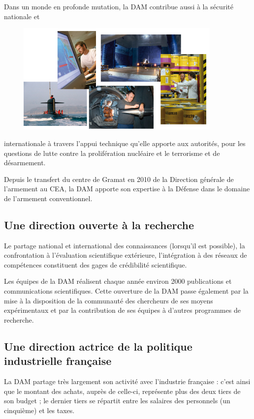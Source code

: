 \documentclass[12pt,a4paper,twoside]{article}
\begin{document}
    Dans un monde en profonde mutation, la DAM contribue aussi à la sécurité
    nationale et
    \begin{figure}
        \includegraphics[width=10cm]{ressources/images/dam/5_thumbnails.jpg}
    \end{figure}
    internationale à travers l'appui technique qu'elle apporte aux autorités, pour
    les questions de lutte contre la prolifération nucléaire et le terrorisme et de
    désarmement.

    Depuis le transfert du centre de Gramat en 2010 de la Direction générale de
    l'armement au CEA, la DAM apporte son expertise à la Défense dans le domaine de
    l'armement conventionnel.

    \subsection*{Une direction ouverte à la recherche}
    Le partage national et international des connaissances (lorsqu'il est possible),
    la confrontation à l'évaluation scientifique extérieure, l'intégration à des
    réseaux de compétences constituent des gages de crédibilité scientifique.

    Les équipes de la DAM réalisent chaque année environ 2000 publications et
    communications scientifiques. Cette ouverture de la DAM passe également par la
    mise à la disposition de la communauté des chercheurs de ses moyens
    expérimentaux et par la contribution de ses équipes à d'autres programmes de
    recherche.

    \subsection*{Une direction actrice de la politique industrielle française}
    La DAM partage très largement son activité avec l'industrie française : c'est
    ainsi que le montant des achats, auprès de celle-ci, représente plus des deux
    tiers de son budget ; le dernier tiers se répartit entre les salaires des
    personnels (un cinquième) et les taxes.
\end{document}
